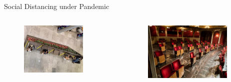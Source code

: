 \begin{frame}{Social Distancing under Pandemic}
\begin{itemize}
        \begin{columns}[c]  %
          \column{5cm}  %
          \begin{figure}[ht]
            \centering
            \includegraphics[width = 0.8\textwidth]{./images/seat_sc.png}
          \end{figure}
          \column{5cm}
          \scriptsize
          \begin{figure}[ht]
            \centering
            \includegraphics[width = 0.9\textwidth]{./images/cinema.jpg}
          \end{figure}
          \end{columns} 
    \end{itemize}
    \end{frame}